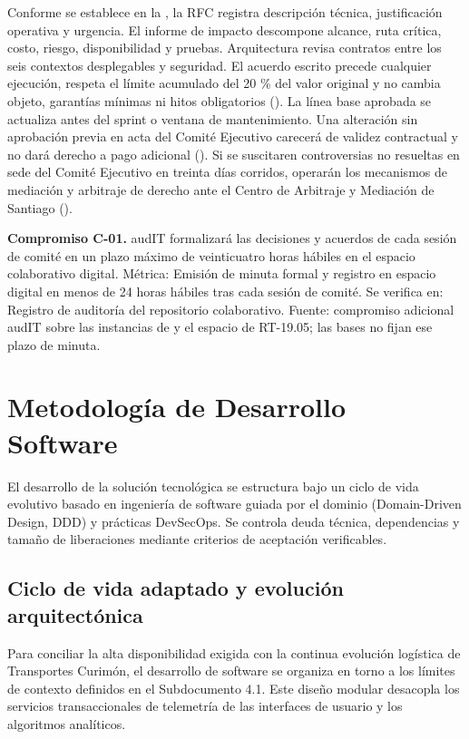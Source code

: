 Conforme se establece en la , la RFC registra descripción técnica, justificación operativa y urgencia. El informe de impacto descompone alcance, ruta crítica, costo, riesgo, disponibilidad y pruebas. Arquitectura revisa contratos entre los seis contextos desplegables y seguridad. El acuerdo escrito precede cualquier ejecución, respeta el límite acumulado del 20 \% del valor original y no cambia objeto, garantías mínimas ni hitos obligatorios (). La línea base aprobada se actualiza antes del sprint o ventana de mantenimiento. Una alteración sin aprobación previa en acta del Comité Ejecutivo carecerá de validez contractual y no dará derecho a pago adicional (). Si se suscitaren controversias no resueltas en sede del Comité Ejecutivo en treinta días corridos, operarán los mecanismos de mediación y arbitraje de derecho ante el Centro de Arbitraje y Mediación de Santiago ().

\textbf{Compromiso C-01.} audIT formalizará las decisiones y acuerdos de cada sesión de comité en un plazo máximo de veinticuatro horas hábiles en el espacio colaborativo digital.  Métrica: Emisión de minuta formal y registro en espacio digital en menos de 24 horas hábiles tras cada sesión de comité. Se verifica en: Registro de auditoría del repositorio colaborativo. Fuente: compromiso adicional audIT sobre las instancias de  y el espacio de RT-19.05; las bases no fijan ese plazo de minuta.

\section{Metodología de Desarrollo Software}\label{sec:6-desarrollo}\label{sec:06-metodologia-de-desarrollo-de-software}

El desarrollo de la solución tecnológica se estructura bajo un ciclo de vida evolutivo basado en ingeniería de software guiada por el dominio (Domain-Driven Design, DDD) y prácticas DevSecOps. Se controla deuda técnica, dependencias y tamaño de liberaciones mediante criterios de aceptación verificables.

\FloatBarrier
\subsection{Ciclo de vida adaptado y evolución arquitectónica}\label{sec:6-desarrollo-ciclovida}\label{sec:06-ciclo-de-vida-adaptado-y-evolucion-arquitectonica}

Para conciliar la alta disponibilidad exigida con la continua evolución logística de Transportes Curimón, el desarrollo de software se organiza en torno a los límites de contexto definidos en el Subdocumento 4.1. Este diseño modular desacopla los servicios transaccionales de telemetría de las interfaces de usuario y los algoritmos analíticos.


